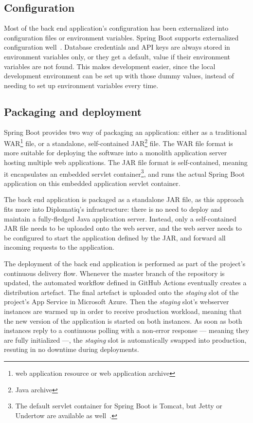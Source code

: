 \subsection{Configuration}

Most of the back end application's configuration has been externalized into configuration files or environment variables. Spring Boot supports externalized configuration well~\cite{spring-boot-reference-docs}. Database credentials and API keys are always stored in environment variables only, or they get a default,  value if their environment variables are not found. This makes development easier, since the local development environment can be set up with those dummy values, instead of needing to set up environment variables every time.

\subsection{Packaging and deployment}

Spring Boot provides two way of packaging an application: either as a traditional WAR\footnote{web application resource or web application archive} file, or a standalone, self-contained JAR\footnote{Java archive} file. The WAR file format is more suitable for deploying the software into a monolith application server hosting multiple web applications. The JAR file format is self-contained, meaning it encapsulates an embedded servlet container\footnote{The default servlet container for Spring Boot is Tomcat, but Jetty or Undertow are available as well~\cite{spring-boot-reference-docs}.}, and runs the actual Spring Boot application on this embedded application servlet container.

The back end application is packaged as a standalone JAR file, as this approach fits more into Diplomatiq's infrastructure: there is no need to deploy and maintain a fully-fledged Java application server. Instead, only a self-contained JAR file needs to be uploaded onto the web server, and the web server needs to be configured to start the application defined by the JAR, and forward all incoming requests to the application.

The deployment of the back end application is performed as part of the project's continuous delivery flow. Whenever the master branch of the repository is updated, the automated workflow defined in GitHub Actions eventually creates a distribution artefact. The final artefact is uploaded onto the \emph{staging} slot of the project's App Service in Microsoft Azure. Then the \emph{staging} slot's webserver instances are warmed up in order to receive production workload, meaning that the new version of the application is started on both instances. As soon as both instances reply to a continuous polling with a non-error response — meaning they are fully initialized —, the \emph{staging} slot is automatically swapped into production, resuting in no downtime during deployments.

